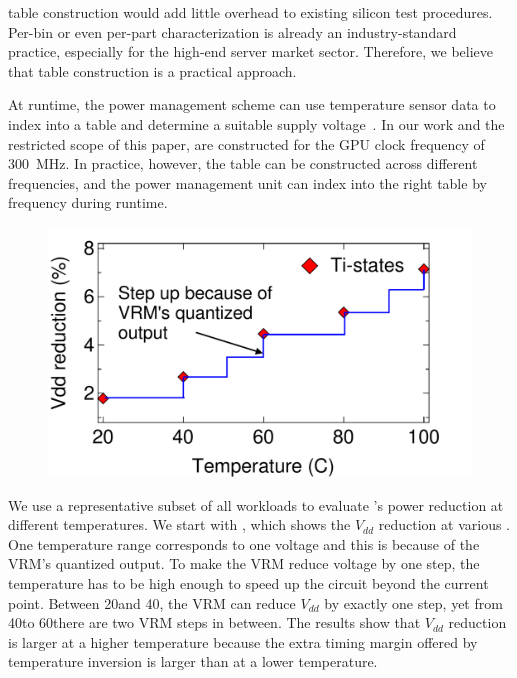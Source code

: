 \tistate table construction would add little overhead to existing silicon test procedures. Per-bin or even per-part characterization is already an industry-standard practice, especially for the high-end server market sector. Therefore, we believe that \tistate table construction is a practical approach.

At runtime, the power management scheme can use temperature sensor data to index into a \tistate table and determine a suitable supply voltage~\cite{sriram2016avfs}. In our work and the restricted scope of this paper, \tistates are constructed for the GPU clock frequency of 300~MHz. In practice, however, the \tistate table can be constructed across different frequencies, and the power management unit can index into the right table by frequency during runtime. 

\begin{figure}[t]
  \centering
  \includegraphics[trim=0 -10 0 0,clip,width=0.7\linewidth]{graphs/temperature/explore-extrapolate.pdf}
  \label{fig:tistate-show}
\end{figure}

We use a representative subset of all workloads to evaluate \tistate's power reduction at different temperatures. We start with , which shows the $V_{dd}$ reduction at various \tistates. One temperature range corresponds to one voltage and this is because of the VRM's quantized output. To make the VRM reduce voltage by one step, the temperature has to be high enough to speed up the circuit beyond the current point. Between 20\C and 40\C, the VRM can reduce $V_{dd}$ by exactly one step, yet from 40\C to 60\C there are two VRM steps in between. The results show that $V_{dd}$ reduction is larger at a higher temperature because the extra timing margin offered by temperature inversion is larger than at a lower temperature. 

